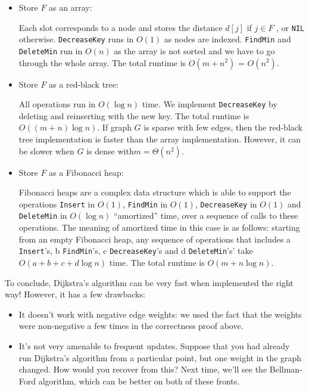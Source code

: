 \documentclass [12pt]{article}
\theoremstyle{definition}
\begin{document}
\begin{itemize}
    \item Store $F$ as an array: 

        Each slot corresponds to a node and stores the distance $d[j]$ if $j \in F$ , or \texttt{NIL} otherwise. \texttt{DecreaseKey} runs in $O(1)$ as nodes are indexed. \texttt{FindMin} and \texttt{DeleteMin} run in $O(n)$ as the array is not sorted and we have to go through the whole array. The total runtime is $O(m + n^2 )$ = $O(n^2)$. 
    \item Store $F$ as a red-black tree:
        
        All operations run in $O(\log n)$ time. We implement \texttt{DecreaseKey} by deleting and reinserting with the new key. The total runtime is $O((m + n) \log n)$. If graph $G$ is sparse with few edges, then the red-black tree implementation is faster than the array implementation. However, it can be slower when $G$ is dense with$ m = \Theta(n^2)$. 
    \item Store $F$ as a Fibonacci heap: 

        Fibonacci heaps are a complex data structure which is able to support the operations \texttt{Insert} in $O(1)$, \texttt{FindMin} in $O(1)$, \texttt{DecreaseKey} in $O(1)$ and \texttt{DeleteMin} in $O(\log n)$ ``amortized'' time, over a sequence of calls to these operations. The meaning of amortized time in this case is as follows: starting from an empty Fibonacci heap, any sequence of operations that includes a \texttt{Insert}'s, b \texttt{FindMin}'s, c \texttt{DecreaseKey}'s and d \texttt{DeleteMin}'s' take $O(a + b + c + d \log n)$ time. The total runtime is $O(m + n \log n)$. 
\end{itemize}

To conclude, Dijkstra's algorithm can be very fast when implemented the right way! However, it has a few drawbacks:

\begin{itemize}
    \item It doesn't work with negative edge weights: we used the fact that the weights were
non-negative a few times in the correctness proof above.
    \item It's not very amenable to frequent updates. Suppose that you had already run Dijkstra's algorithm from a particular point, but one weight in the graph changed. How would you recover from this? Next time, we'll see the Bellman-Ford algorithm, which can be
better on both of these fronts.
\end{itemize}
\end{document}
